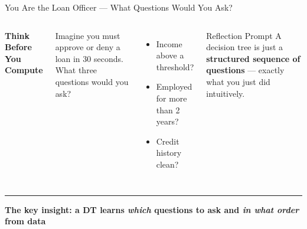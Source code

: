 \documentclass[8pt,aspectratio=169]{beamer}
\newcommand{\bottomnote}[1]{%
\vfill
\vspace{-2mm}
\textcolor{mllavender2}{\rule{\textwidth}{0.4pt}}
\vspace{1mm}
\footnotesize
\textbf{#1}
}
\newenvironment{compactlist}{%
  \begin{itemize}%
    \setlength{\itemsep}{2pt}%
    \setlength{\parskip}{0pt}%
    \setlength{\parsep}{0pt}%
}{%
  \end{itemize}%
}
\newcommand{\highlight}[1]{\textcolor{mlorange}{\textbf{#1}}}
\begin{document}
\begin{frame}[t]{You Are the Loan Officer --- What Questions Would You Ask?}
\begin{columns}[T]
\small
\textbf{Think Before You Compute}

\footnotesize
Imagine you must approve or deny a loan in 30 seconds. What three questions would you ask?
\begin{compactlist}
\item \footnotesize Income above a threshold?
\item \footnotesize Employed for more than 2 years?
\item \footnotesize Credit history clean?
\end{compactlist}
\vspace{2mm}
\begin{exampleblock}{Reflection Prompt}
\footnotesize A decision tree is just a \highlight{structured sequence of questions} --- exactly what you just did intuitively.
\end{exampleblock}

\vspace{8mm}
\end{columns}
\bottomnote{The key insight: a DT learns \emph{which} questions to ask and \emph{in what order} from data}
\end{frame}
\end{document}
